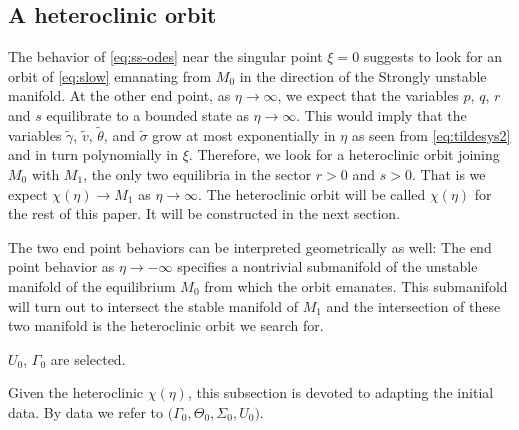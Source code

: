 \documentclass[11pt]{article}
\def\tg{{\tilde{\gamma}}}
\def\tv{{\tilde{v}}}
\def\tth{{\tilde{\theta}}}
\def\ts{{\tilde{\sigma}}}
\theoremstyle{remark}
\begin{document}
\subsection{A heteroclinic orbit}
The behavior of \eqref{eq:ss-odes} near the singular point  $\xi =0$ suggests to look for an orbit of \eqref{eq:slow} emanating from $M_0$ in the direction of the Strongly unstable manifold.
At the other end point, as $\eta \rightarrow \infty$, we expect that the variables $p$, $q$, $r$ and $s$
equilibrate to a bounded state as $\eta \rightarrow \infty$.
This would imply that the variables $\tg$, $\tv$, $\tth$, and $\ts$ grow at most exponentially in $\eta$ as seen from \eqref{eq:tildesys2} and in turn polynomially in $\xi$.
Therefore, we look for a heteroclinic orbit joining $M_0$ with $M_1$, the only two equilibria in the sector $r>0$ and $s>0$.
That is we expect $\chi(\eta) \rightarrow M_1$ as $\eta \rightarrow \infty$.
The heteroclinic orbit will be called $\chi(\eta)$ for the rest of this paper. It will be constructed in the next section.

The two end point behaviors can be interpreted geometrically as well: The end point behavior as $\eta \rightarrow -\infty$ specifies a nontrivial submanifold of the unstable manifold
of the equilibrium  $M_0$ from which the  orbit emanates. This submanifold will turn out to intersect the stable manifold of $M_1$ and the intersection of these two manifold is the heteroclinic orbit we search for.




$U_0$, $\Gamma_0$ are selected.


Given the heteroclinic $\chi(\eta)$, this subsection is devoted to adapting the initial data. By  data we refer to
$\big(\Gamma_0,\Theta_0,\Sigma_0,U_0 \big)$.
\end{document}
